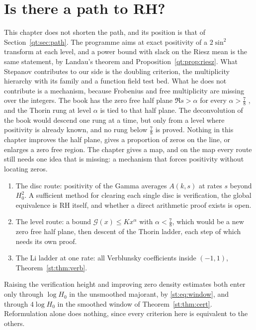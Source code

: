 \section{Is there a path to RH?}\label{st:sec:path}
This chapter does not shorten the path, and its position is that of Section~\ref{qt:sec:path}. The programme aims at exact positivity of a $2\sin^2$ transform at each level, and a power bound with slack on the Riesz mean is the same statement, by Landau's theorem and Proposition~\ref{qt:prop:riesz}. What Stepanov contributes to our side is the doubling criterion, the multiplicity hierarchy with its family and a function field test bed. What he does not contribute is a mechanism, because Frobenius and free multiplicity are missing over the integers. The book has the zero free half plane $\Re s>\alpha$ for every $\alpha>\tfrac78$ \cite{OAI26a}, and the Thorin rung at level $\alpha$ is tied to that half plane. The deconvolution of the book would descend one rung at a time, but only from a level where positivity is already known, and no rung below $\tfrac78$ is proved. Nothing in this chapter improves the half plane, gives a proportion of zeros on the line, or enlarges a zero free region.
The chapter gives a map, and on the map every route still needs one idea that is missing: a mechanism that forces positivity without locating zeros.
\begin{enumerate}
\item The disc route: positivity of the Gamma averages $A(k,s)$ at rates $s$ beyond $H_0^2$. A sufficient method for clearing each single disc is verification, the global equivalence is RH itself, and whether a direct arithmetic proof exists is open.
\item The level route: a bound $\mathcal G(x)\le Kx^{\alpha}$ with $\alpha<\tfrac78$, which would be a new zero free half plane, then descent of the Thorin ladder, each step of which needs its own proof.
\item The Li ladder at one rate: all Verblunsky coefficients inside $(-1,1)$, Theorem~\ref{st:thm:verb}.
\end{enumerate}
Raising the verification height and improving zero density estimates both enter only through $\log H_0$ in the unsmoothed majorant, by \eqref{st:eq:window}, and through $4\log H_0$ in the smoothed window of Theorem~\ref{st:thm:cert}. Reformulation alone does nothing, since every criterion here is equivalent to the others.

